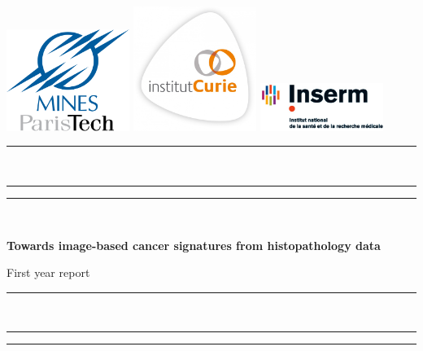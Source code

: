 \documentclass[a4paper,10pt]{article}
\begin{document}
\begin{titlepage}

  
\begin{center}
\includegraphics[width=0.3\textwidth]{Mines_ParisTech.png} 
\includegraphics[width=0.3\textwidth]{CURIE.jpg}
\includegraphics[width=0.3\textwidth]{INSERM.jpg}
\end{center}

 
\noindent
\begin{center}
\textcolor{mycolor}{\rule{16cm}{0.6pt}}\\
\vspace{0.1cm}
\hrule height 2pt
\vspace{0.1cm}
\textcolor{mycolor}{\rule{16cm}{0.6pt}}\\
\end{center}
  \begin{center} \bfseries\Huge
Towards image-based cancer signatures from histopathology data
  \end{center}
  \begin{center} \huge
   First year report
  \end{center}
\begin{center}
\textcolor{mycolor}{\rule{16cm}{0.6pt}}\\
\vspace{0.1cm}
\hrule height 2pt
\vspace{0.1cm}
\textcolor{mycolor}{\rule{16cm}{0.6pt}}\\
\end{center}
  

\end{titlepage}
\end{document}
